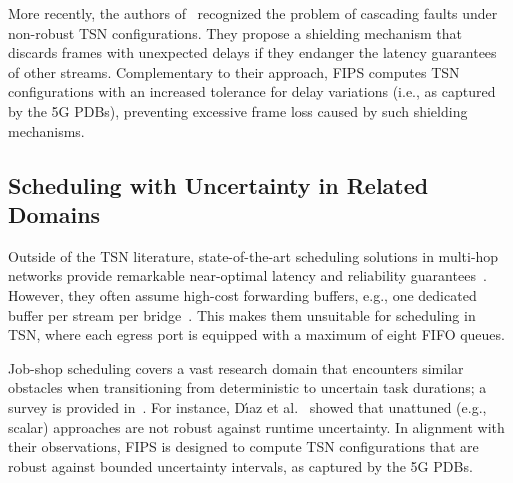 More recently, the authors of~\cite{10682834} recognized the problem of cascading faults under non-robust TSN configurations.
They propose a shielding mechanism that discards frames with unexpected delays if they endanger the latency guarantees of other streams.
Complementary to their approach, FIPS computes TSN configurations with an increased tolerance for delay variations (i.e., as captured by the 5G PDBs), preventing excessive frame loss caused by such shielding mechanisms.

\subsection{Scheduling with Uncertainty in Related Domains}
Outside of the TSN literature, state-of-the-art scheduling solutions in multi-hop networks provide remarkable near-optimal latency and reliability guarantees~\cite{6155625,infocom24_best_paper}.
However, they often assume high-cost forwarding buffers, e.g., one dedicated buffer per stream per bridge~\cite{6155625}.
This makes them unsuitable for scheduling in TSN, where each egress port is equipped with a maximum of eight FIFO queues.

Job-shop scheduling covers a vast research domain that encounters similar obstacles when transitioning from deterministic to uncertain task durations;
a survey is provided in~\cite{XIONG2022105731}.
For instance, D{\'\i}az et al.~\cite{diaz2023robust} showed that unattuned (e.g., scalar) approaches are not robust against runtime uncertainty.
In alignment with their observations, FIPS is designed to compute TSN configurations that are robust against bounded uncertainty intervals, as captured by the 5G PDBs.